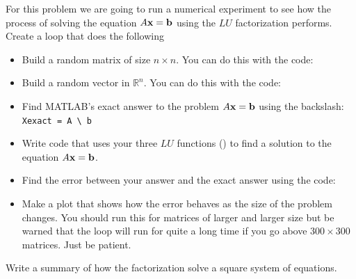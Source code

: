 \begin{problem}
    For this problem we are going to run a numerical experiment to see how the process of
    solving the equation $A {\bf x} = {\bf b}$ using the $LU$ factorization performs.\\ 
    \noindent Create a loop that does the following
    \begin{itemize}
        \item Build a random matrix of size $n \times n$. You can do this with the code:
            \\
        \item Build a random vector in $\mathbb{R}^{n}$. You can do this with the code: \\
        \item Find MATLAB's exact answer to the problem $A{\bf x}={\bf b}$ using the backslash: \\
            \verb|Xexact = A \ b|
        \item Write code that uses your three $LU$ functions () to find a solution to the equation $A{\bf x}={\bf b}$.
        \item Find the error between your answer and the exact answer using the code: \\
        \item Make a plot that shows how the error behaves as the size of the problem
            changes. You should run this for matrices of larger and larger size but be
            warned that the loop will run for quite a long time if you go above
            $300 \times 300$ matrices. Just be patient.
    \end{itemize}
\end{problem}

\begin{problem}
    Write a summary of how the  factorization solve a square system of
    equations.
\end{problem}


